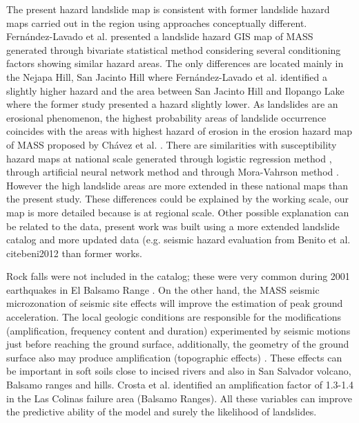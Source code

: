 \documentclass[11pt,twoside]{rmta2010esp}%
\begin{document}
The present hazard landslide map is consistent with former landslide hazard maps carried out in the region using approaches conceptually different. Fern\'{a}ndez-Lavado et al.\cite{fernan2008} presented a landslide hazard GIS map of MASS generated through bivariate statistical method considering several conditioning factors showing similar hazard areas. The only differences are located mainly in the Nejapa Hill, San Jacinto Hill where Fern\'{a}ndez-Lavado et al. \cite{fernan2008} identified a slightly higher hazard and the area between San Jacinto Hill and Ilopango Lake where the former study presented a hazard slightly lower. As landslides are an erosional phenomenon, the highest probability areas of landslide occurrence coincides with the areas with highest hazard of erosion in the erosion hazard map of MASS proposed by Ch\'{a}vez et al. \cite{chavez2014a}. There are similarities with susceptibility hazard maps at national scale generated through logistic regression method \cite{garcia2008}, through artificial neural network method \cite{garcia2010} and through Mora-Vahrson method \cite{snet2004}. However the high landslide areas are more extended in these national maps than the present study. These differences could be explained by the working scale, our map is more detailed because is at regional scale. Other possible explanation can be related to the data, present work was built using a more extended landslide catalog and more updated data (e.g. seismic hazard evaluation from Benito et al. cite{beni2012} than former works.

Rock falls were not included in the catalog; these were very common during 2001 earthquakes in El Balsamo Range \cite{jibson}. On the other hand, the MASS seismic microzonation of seismic site effects will improve the estimation of peak ground acceleration. The local geologic conditions are responsible for the modifications (amplification, frequency content and duration) experimented by seismic motions just before reaching the ground surface, additionally, the geometry of the ground surface also may produce amplification (topographic effects) \cite{aki1993}. These effects can be important in soft soils close to incised rivers and also in San Salvador volcano, Balsamo ranges and hills. Crosta et al. \cite{crosta2005} identified an amplification factor of 1.3-1.4 in the Las Colinas failure area (Balsamo Ranges). All these variables can improve the predictive ability of the model and surely the likelihood of landslides.
\end{document}

